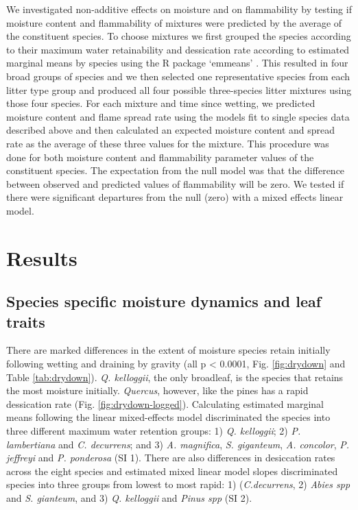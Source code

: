 \documentclass[fire,article,submit,moreauthors,pdftex]{Definitions/mdpi}
\begin{document}
We investigated non-additive effects on moisture and on flammability by testing
if moisture content and flammability of mixtures were predicted by the average
of the constituent species. To choose mixtures we first grouped the species
according to their maximum water retainability and dessication rate according
to estimated marginal means by species using the R package `emmeans'
\cite{Lenth-2019}. This resulted in four broad groups of species and we then
selected one representative species from each litter type group and produced
all four possible three-species litter mixtures using those four species. For
each mixture and time since wetting, we predicted moisture content and flame
spread rate using the models fit to single species data described above and
then calculated an expected moisture content and spread rate as the average of
these three values for the mixture. This procedure was done for both moisture
content and flammability parameter values of the constituent species. The
expectation from the null model was that the difference between observed and
predicted values of flammability will be zero. We tested if there were
significant departures from the null (zero) with a mixed effects linear model.


\section{Results}

\subsection{Species specific moisture dynamics and leaf traits}

There are marked differences in the extent of moisture species retain initially following wetting and draining by gravity (all p < 0.0001, Fig. \ref{fig:drydown} and Table \ref{tab:drydown}). \emph{Q. kelloggii}, the only broadleaf, is the species that retains the most moisture initially.  \emph{Quercus}, however, like the pines has a rapid dessication rate (Fig. \ref{fig:drydown-logged}). Calculating estimated marginal means following the linear mixed-effects model discriminated the species into three different maximum water retention groups: 1) \emph{Q. kelloggii}; 2) \emph{P. lambertiana} and \emph{C. decurrens}; and 3) \emph{A. magnifica}, \emph{S. giganteum}, \emph{A. concolor}, \emph{P. jeffreyi} and \emph{P. ponderosa} (SI 1).  There are also differences in desiccation rates across the eight species and estimated mixed linear model slopes discriminated species into three groups from lowest to most rapid: 1) (\emph{C.decurrens}, 2) \emph{Abies spp} and \emph{S. gianteum}, and 3) \emph{Q. kelloggii} and \emph{Pinus spp} (SI 2).
\end{document}
